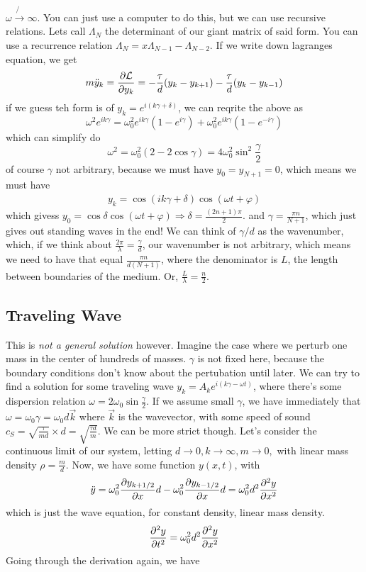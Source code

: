 \documentclass{article} \usepackage{amsmath} \usepackage{amssymb} \usepackage{amsthm} \usepackage[margin=0.2in]{geometry} \usepackage{hyperref} \usepackage{physics} \usepackage{tikz} \usepackage{mathtools} \mathtoolsset{showonlyrefs} \theoremstyle{definition} \newtheorem{theorem}{Theorem}[section] \newtheorem{corollary}{Corollary}[theorem] \newtheorem{lemma}[theorem]{Lemma} \newtheorem{definition}{Definition}[section] \author{Connor Duncan} \date{\today}
\begin{document}
$\omega\not{\rightarrow}\infty$. You can just use a computer to do this, but we can use recursive relations. Lets call $\Lambda_N$ the determinant of our giant matrix of said form. You can use a recurrence relation $\Lambda_N=x\Lambda_{N-1}-\Lambda_{N-2}$. If we write down lagranges equation, we get \begin{align} m\ddot y_k=\pdv{\mathcal L}{y_k}=-\frac{\tau}{d}(y_k-y_{k+1})-\frac{\tau}{d}(y_k-y_{k-1})\\ \end{align} if we guess teh form is of $y_k=e^{i(k\gamma+\delta)}$, we can reqrite the above as \begin{equation} \omega^2e^{ik\gamma}=\omega_0^2e^{ik\gamma}(1-e^{i\gamma})+\omega_0^2e^{ik\gamma}(1-e^{-i\gamma}) \end{equation} which can simplify do \begin{equation} \omega^2=\omega_0^2(2-2\cos\gamma)=4\omega_0^2\sin^2\frac{\gamma}{2} \end{equation} of course $\gamma$ not arbitrary, because we must have $y_0=y_{N+1}=0$, which means we must have \begin{align} y_k=\cos(ik\gamma+\delta)\cos(\omega t+\varphi) \end{align} which givess $y_0=\cos\delta\cos(\omega t+\varphi)\Rightarrow\delta=\frac{(2n+1)\pi}{2}$. and $\gamma=\frac{\pi n}{N+1}$, which just gives out standing waves in the end! We can think of $\gamma/d$ as the wavenumber, which, if we think about $\frac{2\pi}{\lambda}=\frac{\gamma}{d}$, our wavenumber is not arbitrary, which means we need to have that equal $\frac{\pi n}{d(N+1)}$, where the denominator is $L$, the length between boundaries of the medium. Or, $\frac{L}{\lambda}=\frac{n}{2}$. \subsection{Traveling Wave} This is \emph{not a general solution} however. Imagine the case where we perturb one mass in the center of hundreds of masses. $\gamma$ is not fixed here, because the boundary conditions don't know about the pertubation until later. We can try to find a solution for some traveling wave $y_k=A_ke^{i(k\gamma-\omega t)}$, where there's some dispersion relation $\omega=2\omega_0\sin\frac{\gamma}{2}$. If we assume small $\gamma$, we have immediately that $\omega=\omega_0\gamma=\omega_0d\vec{k}$ where $\vec{k}$ is the wavevector, with some speed of sound $c_S=\sqrt{\frac{\tau}{md}}\times d=\sqrt{\frac{\tau d}{m}}$. We can be more strict though. Let's consider the continuous limit of our system, letting $d\rightarrow 0,k\rightarrow\infty, m\rightarrow 0,$ with linear mass density $\rho=\frac{m}{d}$. Now, we have some function $y(x,t)$, with \begin{equation} \ddot y=\omega_0^2\pdv{y_{k+1/2}}{x}d-\omega_0^2\pdv{y_{k-1/2}}{x}d=\omega_0^2d^2\pdv[2]{y}{x} \end{equation} which is just the wave equation, for constant density, linear mass density. \begin{equation} \pdv[2]{y}{t}=\omega_0^2d^2\pdv[2]{y}{x} \end{equation} Going through the derivation again, we have 
\end{document}
